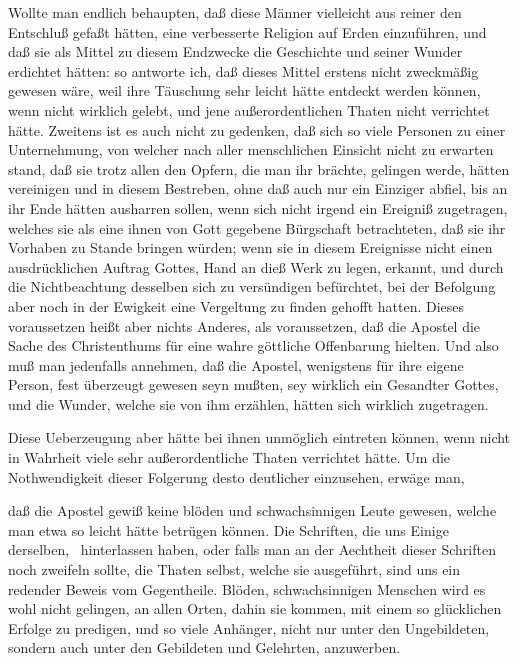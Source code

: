 \begin{aufza}
\begin{aufzb}
\begin{aufzc}
\item Wollte man endlich behaupten, daß diese Männer vielleicht aus reiner  den Entschluß gefaßt hätten, eine verbesserte Religion auf Erden einzuführen, und daß sie als Mittel zu diesem Endzwecke die Geschichte  und seiner Wunder erdichtet hätten: so antworte ich, daß dieses Mittel erstens nicht zweckmäßig gewesen wäre, weil ihre Täuschung sehr leicht hätte entdeckt werden können, wenn  nicht wirklich gelebt, und jene außerordentlichen Thaten nicht verrichtet hätte. Zweitens ist es auch nicht zu gedenken, daß sich so viele Personen zu einer Unternehmung, von welcher nach aller menschlichen Einsicht nicht zu erwarten stand, daß sie trotz allen den Opfern, die man ihr brächte, gelingen werde, hätten vereinigen und in diesem Bestreben, ohne daß auch nur ein Einziger abfiel, bis an ihr Ende hätten ausharren sollen, wenn sich nicht irgend ein Ereigniß zugetragen, welches sie als eine ihnen von Gott gegebene Bürgschaft betrachteten, daß sie ihr Vorhaben zu Stande bringen würden; wenn sie in diesem Ereignisse nicht einen ausdrücklichen Auftrag Gottes, Hand an dieß Werk zu legen, erkannt, und durch die Nichtbeachtung desselben sich zu versündigen befürchtet, bei der Befolgung aber noch in der Ewigkeit eine Vergeltung zu finden gehofft hatten. Dieses voraussetzen heißt aber nichts Anderes, als voraussetzen, daß die Apostel die Sache des Christenthums für eine wahre göttliche Offenbarung hielten. Und also muß man jedenfalls annehmen, daß die Apostel, wenigstens für ihre eigene Person, fest überzeugt gewesen seyn mußten,  sey wirklich ein Gesandter Gottes, und die Wunder, welche sie von ihm erzählen, hätten sich wirklich zugetragen.
\end{aufzc}
\item Diese Ueberzeugung aber hätte bei ihnen unmöglich eintreten können, wenn  nicht in Wahrheit viele sehr außerordentliche Thaten verrichtet hätte. Um die Nothwendigkeit dieser Folgerung desto deutlicher einzusehen, erwäge man,
\begin{aufzc}
\item daß die Apostel gewiß keine blöden und schwachsinnigen Leute gewesen, welche man etwa so leicht hätte betrügen können. Die Schriften, die uns Einige derselben,  \uA\ hinterlassen haben, oder falls man an der Aechtheit dieser Schriften noch zweifeln sollte, die Thaten selbst, welche sie ausgeführt, sind uns ein redender Beweis vom Gegentheile. Blöden, schwachsinnigen Menschen wird es wohl nicht gelingen, an allen Orten, dahin sie kommen, mit einem so glücklichen Erfolge zu predigen, und so viele Anhänger, nicht nur unter den Ungebildeten, sondern auch unter den Gebildeten und Gelehrten, anzuwerben.

\end{aufzc}
\end{aufzb}
\end{aufza}
